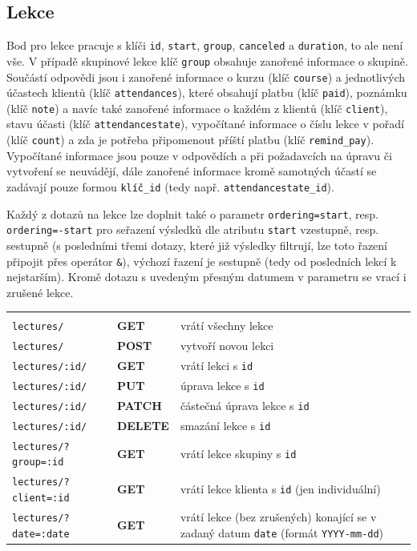         \subsection{Lekce}
        Bod pro lekce pracuje s klíči \verb|id|, \verb|start|, \verb|group|, \verb|canceled| a \verb|duration|, to ale není vše. V případě skupinové lekce klíč \verb|group| obsahuje zanořené informace o skupině. Součástí odpovědi jsou i zanořené informace o kurzu (klíč \verb|course|) a jednotlivých účastech klientů (klíč \verb|attendances|), které obsahují platbu (klíč \verb|paid|), poznámku (klíč \verb|note|) a navíc také zanořené informace o každém z klientů (klíč \verb|client|), stavu účasti (klíč \verb|attendancestate|), vypočítané informace o číslu lekce v pořadí (klíč \verb|count|) a zda je potřeba připomenout příští platbu (klíč \verb|remind_pay|). Vypočítané informace jsou pouze v odpovědích a při požadavcích na úpravu či vytvoření se neuvádějí, dále zanořené informace kromě samotných účastí se zadávají pouze formou \verb|klíč_id| (tedy např. \verb|attendancestate_id|).
        
        Každý z dotazů na lekce lze doplnit také o parametr \verb|ordering=start|, resp. \verb|ordering=-start| pro seřazení výsledků dle atributu \verb|start| vzestupně, resp. sestupně (s posledními třemi dotazy, které již výsledky filtrují, lze toto řazení připojit přes operátor \verb|&|), výchozí řazení je sestupně (tedy od posledních lekcí k nejstarším). Kromě dotazu s uvedeným přesným datumem v parametru se vrací i zrušené lekce.
        
            {\centering
            \begin{tabular}{p{\apiA\textwidth} p{\apiB\textwidth} p{\apiC\textwidth}}&&\\
                \verb|lectures/|            & \textbf{GET}      & vrátí všechny lekce\\
                \verb|lectures/|            & \textbf{POST}     & vytvoří novou lekci\\
                \verb|lectures/:id/|        & \textbf{GET}      & vrátí lekci s \verb|id|\\
                \verb|lectures/:id/|        & \textbf{PUT}      & úprava lekce s \verb|id|\\
                \verb|lectures/:id/|        & \textbf{PATCH}    & částečná úprava lekce s \verb|id|\\
                \verb|lectures/:id/|        & \textbf{DELETE}   & smazání lekce s \verb|id|\\
                \verb|lectures/?group=:id|  & \textbf{GET}      & vrátí lekce skupiny s \verb|id|\\
                \verb|lectures/?client=:id| & \textbf{GET}      & vrátí lekce klienta s \verb|id| (jen individuální)\\
                \verb|lectures/?date=:date| & \textbf{GET}      & vrátí lekce (bez zrušených) konající se v zadaný datum \verb|date| (formát \verb|YYYY-mm-dd|)\\
            \end{tabular}}
        
